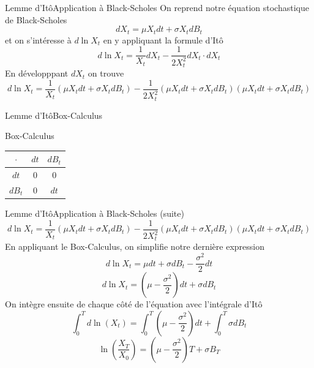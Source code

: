 \documentclass{beamer}
\newcommand{\1}{\mathmybb{1}}
\begin{document}
   \begin{frame}{Lemme d'Itô}{Application à Black-Scholes}
     On reprend notre équation stochastique de Black-Scholes
     \begin{equation}
       dX_{t} = \mu X_{t} dt + \sigma X_{t} dB_{t}
     \end{equation}
     \pause
     et on s'intéresse à $d \ln X_{t}$ en y appliquant la formule d'Itô
     \[
       d \ln X_{t} = \frac{1}{X_{t}} dX_{t} - \frac{1}{2X^{2}_{t}} dX_{t} \cdot dX_{t}
     \]
     \pause
     En développpant $dX_{t}$ on trouve
     \[
       d \ln X_{t} = \frac{1}{X_{t}} \left( \mu X_{t} dt + \sigma X_{t} dB_{t} \right) - \frac{1}{2X_{t}^{2}} \left( \mu X_{t} dt + \sigma X_{t} dB_{t} \right) \left( \mu X_{t}dt + \sigma X_{t} dB_{t}\right)
     \]
     \end{frame}
    \begin{frame}{Lemme d'Itô}{Box-Calculus}
       \begin{block}{Box-Calculus}
         \begin{center}
           \begin{tabular}{|c|c|c|}
             \hline
             $\cdot$ & $dt$ & $dB_t$ \\
             \hline
             $dt$ & 0 & 0 \\
             $dB_{t}$ & 0 & $dt$ \\
             \hline
           \end{tabular}
         \end{center}
         \end{block}
       \end{frame}
       \begin{frame}{Lemme d'Itô}{Application à Black-Scholes (suite)}
    \[
       d \ln X_{t} = \frac{1}{X_{t}} \left( \mu X_{t} dt + \sigma X_{t} dB_{t} \right) - \frac{1}{2X_{t}^{2}} \left( \mu X_{t} dt + \sigma X_{t} dB_{t} \right) \left( \mu X_{t}dt + \sigma X_{t} dB_{t}\right)
     \]
     \pause
     En appliquant le Box-Calculus, on simplifie notre dernière expression
    \[
       d \ln X_{t} =  \mu dt + \sigma dB_{t} - \frac{\sigma^{2}}{2} dt
     \]
     \[
       d \ln X_{t} = \left( \mu - \frac{\sigma^{2}}{2} \right) dt + \sigma dB_{t}
     \]
     \pause
     On intègre ensuite de chaque côté de l'équation avec l'intégrale d'Itô
     \[
       \int_{0}^{T} d \ln \left(  X_{t} \right) = \int_{0}^{T} \left(\mu - \frac{\sigma^{2}}{2} \right) dt + \int_{0}^{T} \sigma dB_{t}
     \]
     \pause
     \[
       \ln \left(\frac{X_{T}}{X_{0}} \right) = \left( \mu - \frac{\sigma^{2}}{2} \right) T + \sigma B_{T}
     \]
        \end{frame}
\end{document}

